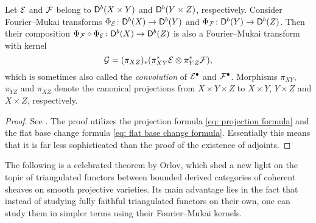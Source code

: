 \begin{proposition}
    \label{Composition of fm is fm}
    \emph{\cite[Proposition 1.3]{Mukai1981}}
    Let $\mathcal E$ and $\mathcal F$ belong to $\mathsf{D}^b(X \times Y)$ and $\mathsf{D}^b(Y \times Z)$, respectively. Consider Fourier--Mukai transforms $\Phi_{\mathcal E} \colon \mathsf{D}^b(X) \to \mathsf{D}^b(Y)$ and ${\Phi_{\mathcal F} \colon \mathsf{D}^b(Y) \to \mathsf{D}^b(Z)}$.
    Then their composition $\Phi_{\mathcal F} \circ \Phi_{\mathcal E} \colon \mathsf{D}^b(X) \to \mathsf{D}^b(Z)$ is also a Fourier--Mukai transform with kernel
    \[
        \mathcal G = (\pi_{XZ})_*(\pi_{XY}^*\mathcal E \otimes \pi_{YZ}^*\mathcal F),
    \]
    which is sometimes also called the \emph{convolution} of $\mathcal E^\bullet$ and $\mathcal F^\bullet$. Morphisms $\pi_{XY}$, $\pi_{YZ}$ and $\pi_{XZ}$ denote the canonical projections from $X \times Y \times Z$ to $X \times Y$, $Y \times Z$ and $X \times Z$, respectively.
\end{proposition}

\begin{proof}
    See \cite[\S 5, 5.10]{huybrechts2006fouriermukai}. The proof utilizes the projection formula \eqref{eq: projection formula} and the flat base change formula \eqref{eq: flat base change formula}. Essentially this means that it is far less sophisticated than the proof of the existence of adjoints.    
\end{proof}

The following is a celebrated theorem by Orlov, which shed a new light on the topic of triangulated functors between bounded derived categories of coherent sheaves on smooth projective varieties. Its main advantage lies in the fact that instead of studying fully faithful triangulated functors on their own, one can study them in simpler terms using their Fourier--Mukai kernels. 

